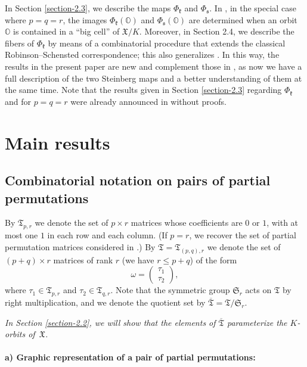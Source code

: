 \documentclass[11pt]{article}
\theoremstyle{definition}
\numberwithin{equation}{section}
\newcommand{\fk}{\mathfrak{k}}
\newcommand{\fs}{\mathfrak{s}}
\newcommand{\Xorbit}{\mathbb{O}}
\newcommand{\permutationsof}[1]{\mathfrak{S}_{#1}}
\newcommand{\ppermutationsof}{\mathfrak{T}}
\newcommand{\parameters}{\overline{\ppermutationsof}}
\newcommand{\Xfv}{\mathfrak{X}}
\begin{document}
In Section \ref{section-2.3}, we describe the maps $\Phi_\fk$ and $\Phi_\fs$. In \cite{FN2}, in the special case where $p=q=r$,
the images $\Phi_\fk(\Xorbit)$ and $\Phi_\fs(\Xorbit)$ are determined when an orbit $\Xorbit$ is contained in a ``big cell'' of $\Xfv/K$.
Moreover, in Section 2.4, we describe the fibers of $\Phi_\fk$ by means of a combinatorial procedure that extends the classical Robinson--Schensted correspondence; this also generalizes \cite[Theorem 7.8]{FN2}.
In this way, the results in the present paper are new and complement those in \cite{FN2}, as now we have a full description of the two Steinberg maps and a better understanding of them at the same time. Note that the results given in Section \ref{section-2.3} regarding $\Phi_\fk$ and for $p=q=r$ were already announced in \cite[\S 2]{FN3} without proofs.




\section{Main results}

\subsection{Combinatorial notation on pairs of partial permutations}

\label{section-2.1}

By $\ppermutationsof_{p,r}$ we denote the set of $p\times r$ matrices whose coefficients are $0$ or $1$, with at most one $1$ in each row and each column.
(If $p=r$, we recover the set of partial permutation matrices considered in \cite{FN2}.)
By $\ppermutationsof=\ppermutationsof_{(p,q),r}$ we denote the set of $(p+q)\times r$ matrices of rank $r$ (we have $r\leq p+q$) of the form
\[\omega=\begin{pmatrix} \tau_1\\ \tau_2 \end{pmatrix},\]
where $\tau_1\in\ppermutationsof_{p,r}$ and $\tau_2\in\ppermutationsof_{q,r}$.
Note that the symmetric group $\permutationsof{r}$ acts on $\ppermutationsof$ by right multiplication, and we denote the quotient set by $\parameters=\ppermutationsof/\permutationsof{r}$.

{\em In Section \ref{section-2.2}, we will show that the elements of $\parameters$ parameterize the $K$-orbits of~$\Xfv$.}


\paragraph{\bf a) Graphic representation of a pair of partial permutations:}\
\end{document}
